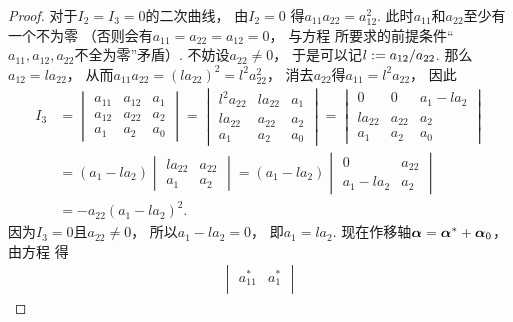 \begin{theorem}
\begin{proof}
对于\(I_2 = I_3 = 0\)的二次曲线，
由\(I_2 = 0\)
得\(a_{11} a_{22} = a_{12}^2\).
此时\(a_{11}\)和\(a_{22}\)至少有一个不为零
（否则会有\(a_{11} = a_{22} = a_{12} = 0\)，
与方程 
所要求的前提条件“\(a_{11},a_{12},a_{22}\)不全为零”矛盾）.
不妨设\(a_{22} \neq 0\)，
于是可以记\(l := a_{12} / a_{22}\).
那么\(a_{12} = l a_{22}\)，
从而\(a_{11} a_{22} = (l a_{22})^2 = l^2 a_{22}^2\)，
消去\(a_{22}\)得\(a_{11} = l^2 a_{22}\)，
因此\begin{align*}
	I_3
	&= \begin{vmatrix}
		a_{11} & a_{12} & a_1 \\
		a_{12} & a_{22} & a_2 \\
		a_1 & a_2 & a_0
	\end{vmatrix}
	= \begin{vmatrix}
		l^2 a_{22} & l a_{22} & a_1 \\
		l a_{22} & a_{22} & a_2 \\
		a_1 & a_2 & a_0
	\end{vmatrix}
	= \begin{vmatrix}
		0 & 0 & a_1 - l a_2 \\
		l a_{22} & a_{22} & a_2 \\
		a_1 & a_2 & a_0
	\end{vmatrix} \\
	&= (a_1 - l a_2)
		\begin{vmatrix}
			l a_{22} & a_{22} \\
			a_1 & a_2
		\end{vmatrix}
	= (a_1 - l a_2)
		\begin{vmatrix}
			0 & a_{22} \\
			a_1 - l a_2 & a_2
		\end{vmatrix} \\
	&= -a_{22} (a_1 - l a_2)^2.
\end{align*}
因为\(I_3 = 0\)且\(a_{22} \neq 0\)，
所以\(a_1 - l a_2 = 0\)，
即\(a_1 = l a_2\).
现在作移轴\(\boldsymbol\alpha = \boldsymbol\alpha^* + \boldsymbol\alpha_0\)，
由方程  得\begin{align*}
	\begin{vmatrix}
		a^*_{11} & a^*_1 \\

\end{vmatrix}
\end{align*}
\end{proof}
\end{theorem}
